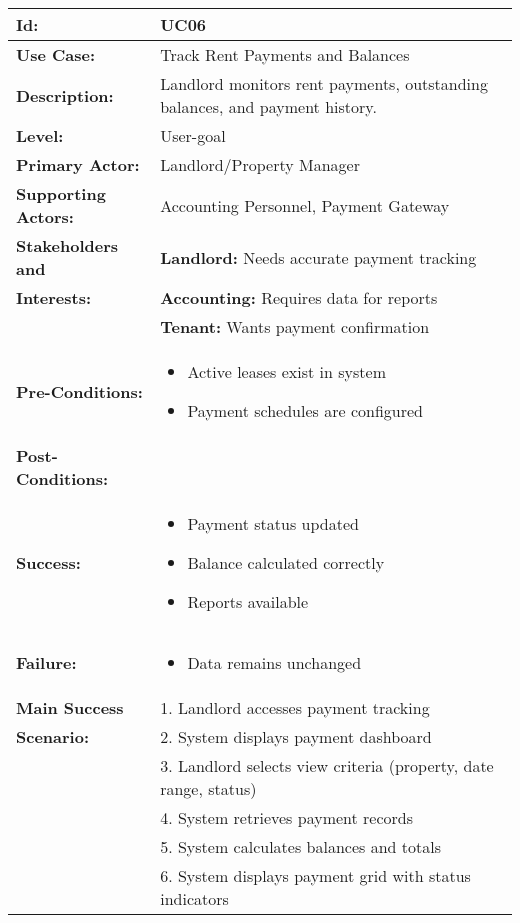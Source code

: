 \documentclass[12pt]{article}
\begin{document}
\begin{longtable}{|p{3cm}|p{11cm}|}
\hline
\textbf{Id:} & UC06 \\
\hline
\textbf{Use Case:} & Track Rent Payments and Balances \\
\hline
\textbf{Description:} & Landlord monitors rent payments, outstanding balances, and payment history. \\
\hline
\textbf{Level:} & User-goal \\
\hline
\textbf{Primary Actor:} & Landlord/Property Manager \\
\hline
\textbf{Supporting Actors:} & Accounting Personnel, Payment Gateway \\
\hline
\textbf{Stakeholders and} & \textbf{Landlord:} Needs accurate payment tracking \\
\textbf{Interests:} & \textbf{Accounting:} Requires data for reports \\
& \textbf{Tenant:} Wants payment confirmation \\
\hline
\textbf{Pre-Conditions:} & 
\begin{itemize}
    \item Active leases exist in system
    \item Payment schedules are configured
\end{itemize} \\
\hline
\textbf{Post-Conditions:} & \\
\textbf{Success:} & 
\begin{itemize}
    \item Payment status updated
    \item Balance calculated correctly
    \item Reports available
\end{itemize} \\
\textbf{Failure:} & 
\begin{itemize}
    \item Data remains unchanged
\end{itemize} \\
\hline
\textbf{Main Success} & 1. Landlord accesses payment tracking \\
\textbf{Scenario:} & 2. System displays payment dashboard \\
& 3. Landlord selects view criteria (property, date range, status) \\
& 4. System retrieves payment records \\
& 5. System calculates balances and totals \\
& 6. System displays payment grid with status indicators \\

\end{longtable}
\end{document}
